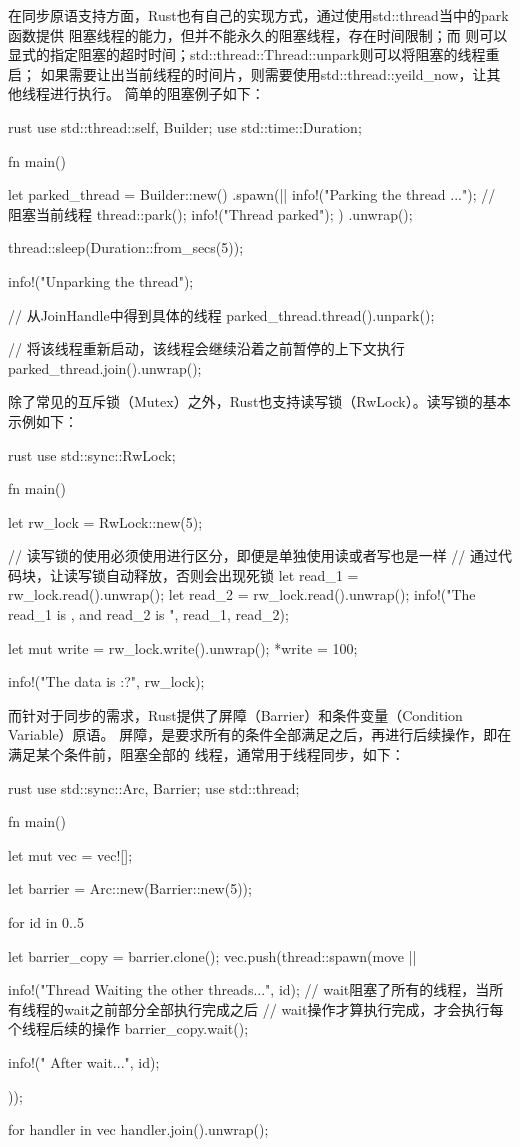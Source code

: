 在同步原语支持方面，Rust也有自己的实现方式，通过使用std::thread当中的park函数提供
阻塞线程的能力，但并不能永久的阻塞线程，存在时间限制；而
则可以显式的指定阻塞的超时时间；std::thread::Thread::unpark则可以将阻塞的线程重启；
如果需要让出当前线程的时间片，则需要使用std::thread::yeild\_now，让其他线程进行执行。
简单的阻塞例子如下：
\begin{code-block}{rust}
use std::thread::{self, Builder};
use std::time::Duration;

fn main() {
    let parked_thread = Builder::new()
        .spawn(|| {
            info!("Parking the thread ...");
            // 阻塞当前线程
            thread::park();
            info!("Thread parked");
        })
        .unwrap();

    thread::sleep(Duration::from_secs(5));

    info!("Unparking the thread");

    // 从JoinHandle中得到具体的线程
    parked_thread.thread().unpark();

    // 将该线程重新启动，该线程会继续沿着之前暂停的上下文执行
    parked_thread.join().unwrap();
}
\end{code-block}

除了常见的互斥锁（Mutex）之外，Rust也支持读写锁（RwLock）。读写锁的基本示例如下：
\begin{code-block}{rust}
use std::sync::RwLock;

fn main() {
    let rw_lock = RwLock::new(5);

    // 读写锁的使用必须使用{}进行区分，即便是单独使用读或者写也是一样
    // 通过代码块{}，让读写锁自动释放，否则会出现死锁
    {
        let read_1 = rw_lock.read().unwrap();
        let read_2 = rw_lock.read().unwrap();
        info!("The read_1 is {}, and read_2 is {}", read_1, read_2);
    }

    {
        let mut write = rw_lock.write().unwrap();
        *write = 100;
    }

    info!("The data is {:?}", rw_lock);
}
\end{code-block}

而针对于同步的需求，Rust提供了屏障（Barrier）和条件变量（Condition Variable）原语。
屏障，是要求所有的条件全部满足之后，再进行后续操作，即在满足某个条件前，阻塞全部的
线程，通常用于线程同步，如下：
\begin{code-block}{rust}
use std::sync::{Arc, Barrier};
use std::thread;

fn main() {
    let mut vec = vec![];

    let barrier = Arc::new(Barrier::new(5));

    for id in 0..5 {
        let barrier_copy = barrier.clone();
        vec.push(thread::spawn(move || {
            info!("Thread {} Waiting the other threads...", id);
            // wait阻塞了所有的线程，当所有线程的wait之前部分全部执行完成之后
            // wait操作才算执行完成，才会执行每个线程后续的操作
            barrier_copy.wait();

            info!("{} After wait...", id);
        }));
    }
    for handler in vec {
        handler.join().unwrap();
    }
}
\end{code-block}

